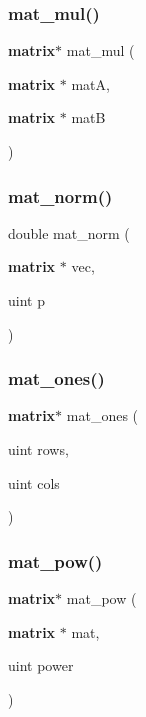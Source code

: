 \subsubsection{mat\+\_\+mul()}
{\footnotesize\ttfamily \textbf{ matrix}$\ast$ mat\+\_\+mul (\begin{DoxyParamCaption}\item[{\textbf{ matrix} $\ast$}]{matA,  }\item[{\textbf{ matrix} $\ast$}]{matB }\end{DoxyParamCaption})}

\mbox{\label{mat_lib_8h_a4bd90cf3d08447c8e929ecab9a1c4568}} 
\subsubsection{mat\+\_\+norm()}
{\footnotesize\ttfamily double mat\+\_\+norm (\begin{DoxyParamCaption}\item[{\textbf{ matrix} $\ast$}]{vec,  }\item[{uint}]{p }\end{DoxyParamCaption})}

\mbox{\label{mat_lib_8h_a99094eaa3ead74b0782fd1e8898eee43}} 
\subsubsection{mat\+\_\+ones()}
{\footnotesize\ttfamily \textbf{ matrix}$\ast$ mat\+\_\+ones (\begin{DoxyParamCaption}\item[{uint}]{rows,  }\item[{uint}]{cols }\end{DoxyParamCaption})}

\mbox{\label{mat_lib_8h_a9ce519909d6462338832a0cd711e63a4}} 
\subsubsection{mat\+\_\+pow()}
{\footnotesize\ttfamily \textbf{ matrix}$\ast$ mat\+\_\+pow (\begin{DoxyParamCaption}\item[{\textbf{ matrix} $\ast$}]{mat,  }\item[{uint}]{power }\end{DoxyParamCaption})}

